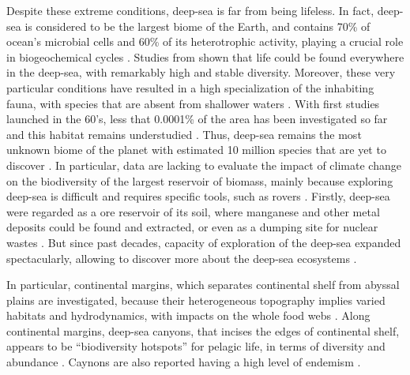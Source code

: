 Despite these extreme conditions, deep-sea is far from being lifeless. In fact, deep-sea is considered to be the largest biome of the Earth, and contains 70\% of ocean's microbial cells and 60\% of its heterotrophic activity, playing a crucial role in biogeochemical cycles \citep{salazar2016}. Studies from \citet{grassle1992,parkes1994,todo2005} shown that life could be found everywhere in the deep-sea, with remarkably high and stable diversity. Moreover, these very particular conditions have resulted in a high specialization of the inhabiting fauna, with species that are absent from shallower waters \citep{garcia2021}. With first studies launched in the 60's, less that 0.0001\% of the area has been investigated so far and this habitat remains understudied \citep{danovaro2017,richards2019}. Thus, deep-sea remains the most unknown biome of the planet with estimated 10 million species that are yet to discover \citep{danovaro2017,grassle1992}. In particular, data are lacking to evaluate the impact of climate change on the biodiversity of the largest reservoir of biomass, mainly because exploring deep-sea is difficult and requires specific tools, such as rovers \citep{danovaro2008,danovaro2014}. Firstly, deep-sea were regarded as a ore reservoir of its soil, where manganese and other metal deposits could be found and extracted, or even as a dumping site for nuclear wastes \citep{baker2020,gillet2013,halfar2002}. But since past decades, capacity of exploration of the deep-sea expanded spectacularly, allowing to discover more about the deep-sea ecosystems \citep{danovaro2014}.

In particular, continental margins, which separates continental shelf from abyssal plains are investigated, because their heterogeneous topography implies varied habitats and hydrodynamics, with impacts on the whole food webs \citep{danovaro2009,fernandez-arcaya2017}. Along continental margins, deep-sea canyons, that incises the edges of continental shelf, appears to be ``biodiversity hotspots'' for pelagic life, in terms of diversity and abundance \citep{aissi2012,danovaro2009,gillet2013,robertson2020}. Caynons are also reported having a high level of endemism \citep{danovaro2009,danovaro2017}. 

